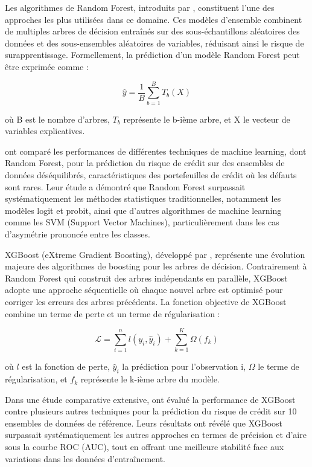 Les algorithmes de Random Forest, introduits par \citet{breiman2001}, constituent l'une des approches les plus utilisées dans ce domaine. Ces modèles d'ensemble combinent de multiples arbres de décision entraînés sur des sous-échantillons aléatoires des données et des sous-ensembles aléatoires de variables, réduisant ainsi le risque de surapprentissage. Formellement, la prédiction d'un modèle Random Forest peut être exprimée comme :

\begin{equation}
\hat{y} = \frac{1}{B} \sum_{b=1}^{B} T_b(X)
\end{equation}

où B est le nombre d'arbres, $T_b$ représente le b-ième arbre, et X le vecteur de variables explicatives.

\citet{brown2012} ont comparé les performances de différentes techniques de machine learning, dont Random Forest, pour la prédiction du risque de crédit sur des ensembles de données déséquilibrés, caractéristiques des portefeuilles de crédit où les défauts sont rares. Leur étude a démontré que Random Forest surpassait systématiquement les méthodes statistiques traditionnelles, notamment les modèles logit et probit, ainsi que d'autres algorithmes de machine learning comme les SVM (Support Vector Machines), particulièrement dans les cas d'asymétrie prononcée entre les classes.

XGBoost (eXtreme Gradient Boosting), développé par \citet{chen2016}, représente une évolution majeure des algorithmes de boosting pour les arbres de décision. Contrairement à Random Forest qui construit des arbres indépendants en parallèle, XGBoost adopte une approche séquentielle où chaque nouvel arbre est optimisé pour corriger les erreurs des arbres précédents. La fonction objective de XGBoost combine un terme de perte et un terme de régularisation :

\begin{equation}
\mathcal{L} = \sum_{i=1}^n l(y_i, \hat{y}_i) + \sum_{k=1}^K \Omega(f_k)
\end{equation}

où $l$ est la fonction de perte, $\hat{y}_i$ la prédiction pour l'observation i, $\Omega$ le terme de régularisation, et $f_k$ représente le k-ième arbre du modèle.

Dans une étude comparative extensive, \citet{xia2017} ont évalué la performance de XGBoost contre plusieurs autres techniques pour la prédiction du risque de crédit sur 10 ensembles de données de référence. Leurs résultats ont révélé que XGBoost surpassait systématiquement les autres approches en termes de précision et d'aire sous la courbe ROC (AUC), tout en offrant une meilleure stabilité face aux variations dans les données d'entraînement.

